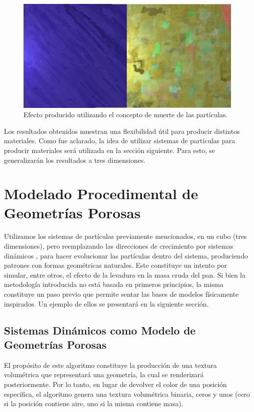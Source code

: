 \begin{figure}[t!]
\centering
\includegraphics[scale=0.2]{figures/muerte}
\caption{Efecto producido utilizando el concepto de muerte de las partículas.}
\label{muerte}
\end{figure}

Los resultados obtenidos muestran una flexibilidad útil para producir distintos materiales.
Como fue aclarado, la idea de utilizar sistemas de partículas para producir materiales será utilizada en la sección siguiente.
Para esto, se generalizarán los resultados a tres dimensiones.

\section{Modelado Procedimental de Geometrías Porosas}

Utilizamos los sistemas de partículas previamente mencionados, en un cubo (tres dimensiones), pero reemplazando las direcciones de crecimiento por sistemas dinámicos \cite{Strogatz2001}, para hacer evolucionar las partículas dentro del sistema, produciendo patrones con formas geométricas naturales.
Este constituye un intento por simular, entre otros,  el efecto de la levadura en la masa cruda del pan.
Si bien la metodología introducida no está basada en primeros principios, la misma constituye un paso previo que permite sentar las bases de modelos físicamente inspirados.
Un ejemplo de ellos se presentará en la siguiente sección.

\subsection[Sistemas Dinámicos y Geometrías Porosas]{Sistemas Dinámicos como Modelo de Geometrías Porosas}
El propósito de este algoritmo constituye la producción de una textura volumétrica que representará una geometría, la cual se renderizará posteriormente.
Por lo tanto, en lugar de devolver el color de una posici\'on espec\'ifica, el algoritmo genera una textura volumétrica binaria, ceros y unos (cero si la posici\'on contiene aire, uno si la misma contiene masa).

